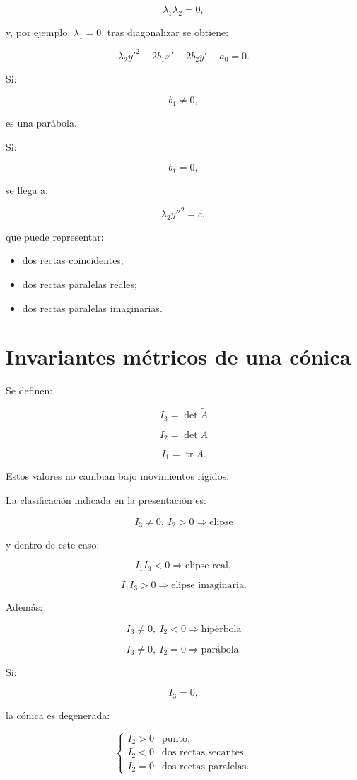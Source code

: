 \documentclass[11pt,a4paper]{article}
\newcommand{\tr}{\operatorname{tr}}
\begin{document}
\[
\lambda_1\lambda_2=0,
\]

y, por ejemplo, $\lambda_1=0$, tras diagonalizar se obtiene:

\[
\lambda_2y'^2+2b_1x'+2b_2y'+a_0=0.
\]

Si:

\[
b_1\neq0,
\]

es una parábola.

Si:

\[
b_1=0,
\]

se llega a:

\[
\lambda_2y''^2=c,
\]

que puede representar:

\begin{itemize}
\item dos rectas coincidentes;
\item dos rectas paralelas reales;
\item dos rectas paralelas imaginarias.
\end{itemize}

\section{Invariantes métricos de una cónica}

Se definen:

\[
\boxed{
I_3=\det\widetilde A
}
\]

\[
\boxed{
I_2=\det A
}
\]

\[
\boxed{
I_1=\tr A.
}
\]

Estos valores no cambian bajo movimientos rígidos.

La clasificación indicada en la presentación es:

\[
\boxed{
I_3\neq0,\ I_2>0
\Rightarrow
\text{elipse}
}
\]

y dentro de este caso:

\[
I_1I_3<0
\Rightarrow
\text{elipse real},
\]

\[
I_1I_3>0
\Rightarrow
\text{elipse imaginaria}.
\]

Además:

\[
\boxed{
I_3\neq0,\ I_2<0
\Rightarrow
\text{hipérbola}
}
\]

\[
\boxed{
I_3\neq0,\ I_2=0
\Rightarrow
\text{parábola}.
}
\]

Si:

\[
I_3=0,
\]

la cónica es degenerada:

\[
\boxed{
\begin{cases}
I_2>0 & \text{punto},\\
I_2<0 & \text{dos rectas secantes},\\
I_2=0 & \text{dos rectas paralelas}.
\end{cases}
}
\]
\end{document}

